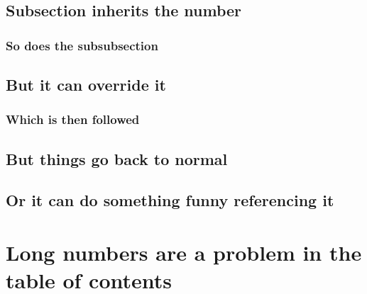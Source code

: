 \documentclass{homework}
\begin{document}
\lipsum[9]

\subsection{Subsection inherits the number}

\subsubsection{So does the subsubsection}

\lipsum[10]

\subsection[C$\xi$.b|]{But it can override it}

\subsubsection{Which is then followed}

\lipsum[11]

\subsection{But things go back to normal}

\lipsum[12]

\subsection[\thesection.$\gamma$|]{Or it can do something funny referencing it}

\lipsum[13]

\section[2011|]{Long numbers are a problem in the table of contents}
\end{document}

